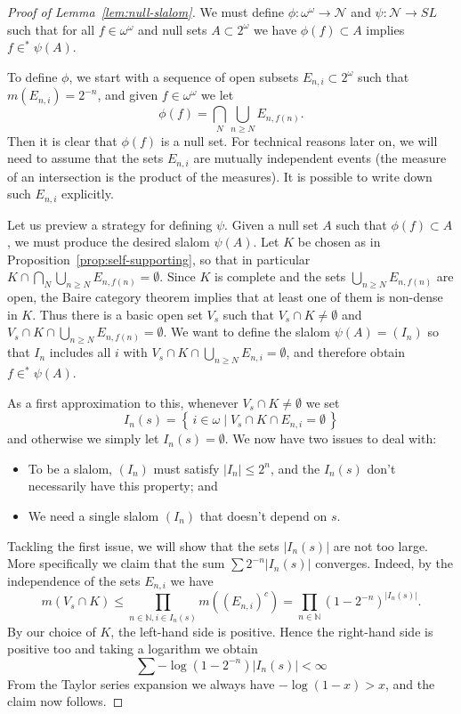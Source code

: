 \documentclass[11pt,oneside,a4paper]{amsbook}
\newcommand{\set}[1]{\left\{\,#1\,\right\}}
\newcommand{\N}{\mathbb N}
\newcommand{\Null}{\mathcal N}
\theoremstyle{definition}
\theoremstyle{plain}
\theoremstyle{definition}
\theoremstyle{remark}
\numberwithin{equation}{section}
\numberwithin{figure}{section}
\begin{document}
\begin{proof}[Proof of Lemma~\ref{lem:null-slalom}]
  We must define $\phi\colon\omega^\omega\to\Null$ and $\psi\colon\Null\to SL$ such that for all $f\in\omega^\omega$ and null sets $A\subset2^\omega$ we have $\phi(f)\subset A$ implies $f\in^*\psi(A)$.

  To define $\phi$, we start with a sequence of open subsets $E_{n,i}\subset2^\omega$ such that $m(E_{n,i})=2^{-n}$, and given $f\in\omega^\omega$ we let
  \[\phi(f)=\bigcap_N\bigcup_{n\geq N} E_{n,f(n)}\text{.}
  \]
  Then it is clear that $\phi(f)$ is a null set. For technical reasons later on, we will need to assume that the sets $E_{n,i}$ are mutually independent events (the measure of an intersection is the product of the measures). It is possible to write down such $E_{n,i}$ explicitly.

  Let us preview a strategy for defining $\psi$. Given a null set $A$ such that $\phi(f)\subset A$, we must produce the desired slalom $\psi(A)$. Let $K$ be chosen as in Proposition~\ref{prop:self-supporting}, so that in particular $K\cap\bigcap_N\bigcup_{n\geq N}E_{n,f(n)}=\emptyset$. Since $K$ is complete and the sets $\bigcup_{n\geq N}E_{n,f(n)}$ are open, the Baire category theorem implies that at least one of them is non-dense in $K$. Thus there is a basic open set $V_s$ such that $V_s\cap K\neq\emptyset$ and $V_s\cap K\cap\bigcup_{n\geq N}E_{n,f(n)}=\emptyset$. We want to define the slalom $\psi(A)=(I_n)$ so that $I_n$ includes all $i$ with $V_s\cap K\cap\bigcup_{n\geq N}E_{n,i}=\emptyset$, and therefore obtain $f\in^*\psi(A)$.

  As a first approximation to this, whenever $V_s\cap K\neq\emptyset$ we set
  \[I_n(s)=\set{i\in\omega\mid V_s\cap K\cap E_{n,i}=\emptyset}
  \]
  and otherwise we simply let $I_n(s)=\emptyset$. We now have two issues to deal with:
  \begin{itemize}
    \item To be a slalom, $(I_n)$ must satisfy $|I_n|\leq2^n$, and the $I_n(s)$ don't necessarily have this property; and
    \item We need a single slalom $(I_n)$ that doesn't depend on $s$.
  \end{itemize}

  Tackling the first issue, we will show that the sets $|I_n(s)|$ are not too large. More specifically we claim that the sum $\sum2^{-n}|I_n(s)|$ converges. Indeed, by the independence of the sets $E_{n,i}$ we have
  \[m(V_s\cap K)\leq\prod_{n\in\N,i\in I_n(s)}m((E_{n,i})^c)
  =\prod_{n\in\N}(1-2^{-n})^{|I_n(s)|}\text{.}
  \]
  By our choice of $K$, the left-hand side is positive. Hence the right-hand side is positive too and taking a logarithm we obtain
  \[\sum-\log(1-2^{-n})|I_n(s)|<\infty
  \]
  From the Taylor series expansion we always have $-\log(1-x)>x$, and the claim now follows.


\end{proof}
\end{document}
